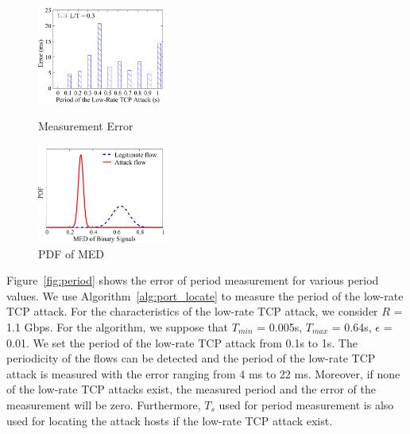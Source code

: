 \documentclass[conference]{IEEEtran}
\begin{document}
\begin{figure}
\vspace{0in}


\begin{minipage}[t]{0.49\linewidth}
\centering
\includegraphics[width=1.7in]{Evaluation/period.pdf}
\caption{\small{Measurement Error}}
\label{fig:period}
\end{minipage}
\begin{minipage}[t]{0.49\linewidth}
\centering
\includegraphics[width=1.7in]{Evaluation/distribution.pdf}
\caption{\small{PDF of MED}}
\label{fig:PDF}
\end{minipage}
\vspace{-0.2in}
\end{figure}

Figure~\ref{fig:period} shows the error of period measurement for various period values. We use Algorithm~\ref{alg:port_locate} to measure the period of the low-rate TCP attack. For the characteristics of the low-rate TCP attack, we consider $R $ = 1.1 Gbps. For the algorithm, we suppose that $T_{min}$  = 0.005s, $T_{max}$ = 0.64s, $\epsilon$ = 0.01. We set the period of the low-rate TCP attack from 0.1s to 1s. The periodicity of the flows can be detected and the period of the low-rate TCP attack is measured with the error ranging from 4 ms to 22 ms. Moreover, if none of the low-rate TCP attacks exist, the measured period and the error of the measurement will be zero. Furthermore, $T_s$ used for period measurement is also used for locating the attack hosts if the low-rate TCP attack exist.
\end{document}
